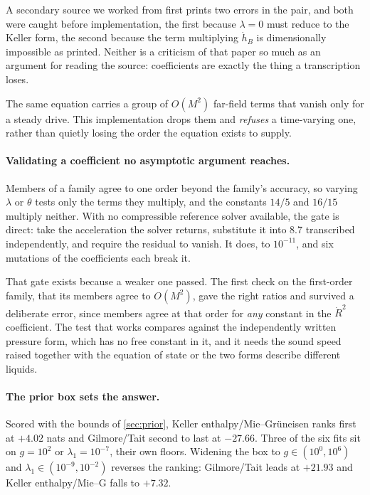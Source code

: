 \documentclass[10pt]{article}
\begin{document}
A secondary source we worked from first prints two errors in the pair, and both were caught
before implementation, the first because $\lambda=0$ must reduce to the Keller form, the
second because the term multiplying $\dot h_B$ is dimensionally impossible as printed. Neither
is a criticism of that paper so much as an argument for reading the source: coefficients are
exactly the thing a transcription loses.

The same equation carries a group of $O(M^2)$ far-field terms that vanish only for a steady
drive. This implementation drops them and \emph{refuses} a time-varying one, rather than
quietly losing the order the equation exists to supply.

\paragraph{Validating a coefficient no asymptotic argument reaches.} Members of a family agree
to one order beyond the family's accuracy, so varying $\lambda$ or $\theta$ tests only the
terms they multiply, and the constants $14/5$ and $16/15$ multiply neither. With no
compressible reference solver available, the gate is direct: take the acceleration the solver
returns, substitute it into 8.7 transcribed independently, and require the residual to vanish.
It does, to $10^{-11}$, and six mutations of the coefficients each break it.

That gate exists because a weaker one passed. The first check on the first-order family, that
its members agree to $O(M^2)$, gave the right ratios and survived a deliberate error, since
members agree at that order for \emph{any} constant in the $\dot R^2$ coefficient. The test
that works compares against the independently written pressure form, which has no free constant
in it, and it needs the sound speed raised together with the equation of state or the two forms
describe different liquids.

\paragraph{The prior box sets the answer.} Scored with the bounds of \cref{sec:prior},
Keller enthalpy/Mie--Gr\"uneisen ranks first at $+4.02$ nats and Gilmore/Tait second to last at
$-27.66$. Three of the six fits sit on $g=10^2$ or $\lambda_1=10^{-7}$, their own floors.
Widening the box to $g\in(10^0,10^6)$ and $\lambda_1\in(10^{-9},10^{-2})$ reverses the
ranking: Gilmore/Tait leads at $+21.93$ and Keller enthalpy/Mie--G falls to $+7.32$.
\end{document}
